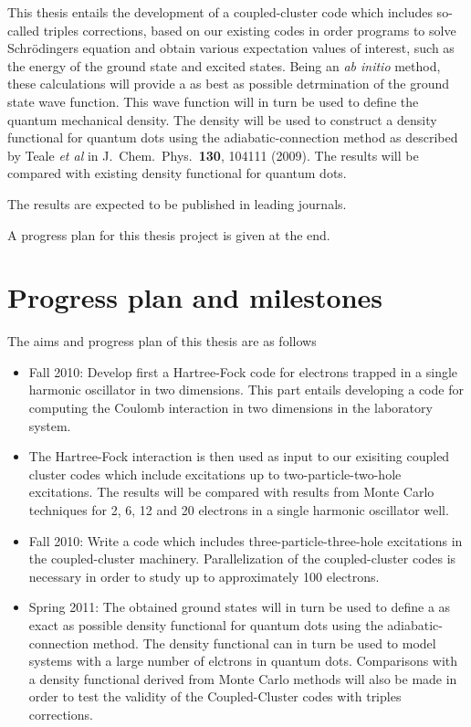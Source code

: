 This thesis 
entails the development of a coupled-cluster code which includes so-called triples corrections, based on our existing codes in order
programs to solve Schr\"odingers equation
and obtain various expectation values of interest, such as the energy
of the ground state and excited states. 
Being an {\em ab initio} method, these calculations will provide a as best as possible detrmination of the 
ground state wave function. This wave function will in turn be used to define the quantum
mechanical density.  The density will be used to construct a density functional for quantum dots
using the adiabatic-connection method as described by Teale {\em et al} in J.~Chem.~Phys.~{\bf 130},
104111 (2009).  The results will be compared with existing density functional for quantum dots.

The results are expected to be published in leading journals.




A progress plan for this thesis project is given at the end.


\section*{Progress plan and milestones}
The aims and progress plan of this thesis are as follows
\begin{itemize}
\item Fall 2010: Develop first a Hartree-Fock code for electrons trapped in a single harmonic oscillator  
in two dimensions.   This part entails developing a code for computing the Coulomb interaction
in two dimensions in the laboratory system.
\item The Hartree-Fock interaction is then used as input to our exisiting coupled cluster codes which include excitations up to two-particle-two-hole excitations.
The results will be compared with results from Monte Carlo 
techniques for 2, 6, 12 and 20 
electrons in a single harmonic oscillator well.
\item Fall 2010: Write a code which includes three-particle-three-hole excitations in the coupled-cluster machinery. Parallelization of the coupled-cluster codes is necessary in order to study up to approximately 100 electrons.

 \item Spring 2011: The obtained ground states will in turn be used to define a as exact as possible 
density functional for quantum dots
using the adiabatic-connection method. The density functional can in turn be used to model
systems with a large number of elctrons in quantum dots. Comparisons with a density functional derived from Monte Carlo  methods will also be made in order to
test the validity of the Coupled-Cluster codes with triples corrections.
\end{itemize}
 



